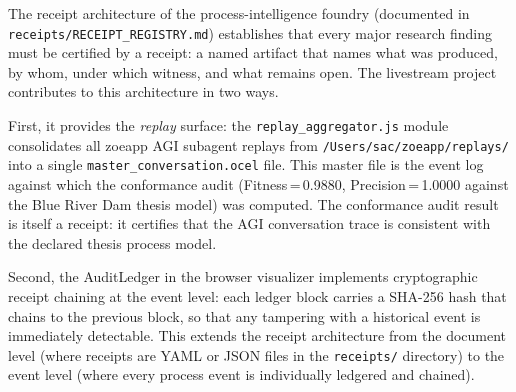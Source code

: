 The receipt architecture of the process-intelligence foundry (documented in
\texttt{receipts/RECEIPT\_REGISTRY.md}) establishes that every major research
finding must be certified by a receipt: a named artifact that names what was
produced, by whom, under which witness, and what remains open. The livestream
project contributes to this architecture in two ways.

First, it provides the \emph{replay} surface: the \texttt{replay\_aggregator.js}
module consolidates all zoeapp AGI subagent replays from
\texttt{/Users/sac/zoeapp/replays/} into a single \texttt{master\_conversation.ocel}
file. This master file is the event log against which the conformance audit
(Fitness\,=\,0.9880, Precision\,=\,1.0000 against the Blue River Dam thesis model)
was computed. The conformance audit result is itself a receipt: it certifies that
the AGI conversation trace is consistent with the declared thesis process model.

Second, the AuditLedger in the browser visualizer implements cryptographic receipt
chaining at the event level: each ledger block carries a SHA-256 hash that chains
to the previous block, so that any tampering with a historical event is immediately
detectable. This extends the receipt architecture from the document level (where
receipts are YAML or JSON files in the \texttt{receipts/} directory) to the event
level (where every process event is individually ledgered and chained).
